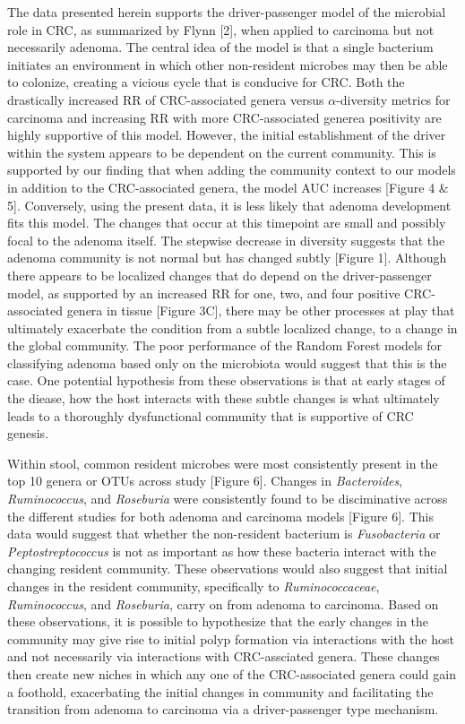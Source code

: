 \documentclass[12pt,]{article}
\begin{document}
The data presented herein supports the driver-passenger model of the
microbial role in CRC, as summarized by Flynn {[}2{]}, when applied to
carcinoma but not necessarily adenoma. The central idea of the model is
that a single bacterium initiates an environment in which other
non-resident microbes may then be able to colonize, creating a vicious
cycle that is conducive for CRC. Both the drastically increased RR of
CRC-associated genera versus \(\alpha\)-diversity metrics for carcinoma
and increasing RR with more CRC-associated generea positivity are highly
supportive of this model. However, the initial establishment of the
driver within the system appears to be dependent on the current
community. This is supported by our finding that when adding the
community context to our models in addition to the CRC-associated
genera, the model AUC increases {[}Figure 4 \& 5{]}. Conversely, using
the present data, it is less likely that adenoma development fits this
model. The changes that occur at this timepoint are small and possibly
focal to the adenoma itself. The stepwise decrease in diversity suggests
that the adenoma community is not normal but has changed subtly
{[}Figure 1{]}. Although there appears to be localized changes that do
depend on the driver-passenger model, as supported by an increased RR
for one, two, and four positive CRC-associated genera in tissue
{[}Figure 3C{]}, there may be other processes at play that ultimately
exacerbate the condition from a subtle localized change, to a change in
the global community. The poor performance of the Random Forest models
for classifying adenoma based only on the microbiota would suggest that
this is the case. One potential hypothesis from these observations is
that at early stages of the diease, how the host interacts with these
subtle changes is what ultimately leads to a thoroughly dysfunctional
community that is supportive of CRC genesis.

Within stool, common resident microbes were most consistently present in
the top 10 genera or OTUs across study {[}Figure 6{]}. Changes in
\emph{Bacteroides}, \emph{Ruminococcus}, and \emph{Roseburia} were
consistently found to be disciminative across the different studies for
both adenoma and carcinoma models {[}Figure 6{]}. This data would
suggest that whether the non-resident bacterium is \emph{Fusobacteria}
or \emph{Peptostreptococcus} is not as important as how these bacteria
interact with the changing resident community. These observations would
also suggest that initial changes in the resident community,
specifically to \emph{Ruminococcaceae}, \emph{Ruminococcus}, and
\emph{Roseburia}, carry on from adenoma to carcinoma. Based on these
observations, it is possible to hypothesize that the early changes in
the community may give rise to initial polyp formation via interactions
with the host and not necessarily via interactions with CRC-assciated
genera. These changes then create new niches in which any one of the
CRC-associated genera could gain a foothold, exacerbating the initial
changes in community and facilitating the transition from adenoma to
carcinoma via a driver-passenger type mechanism.
\end{document}
